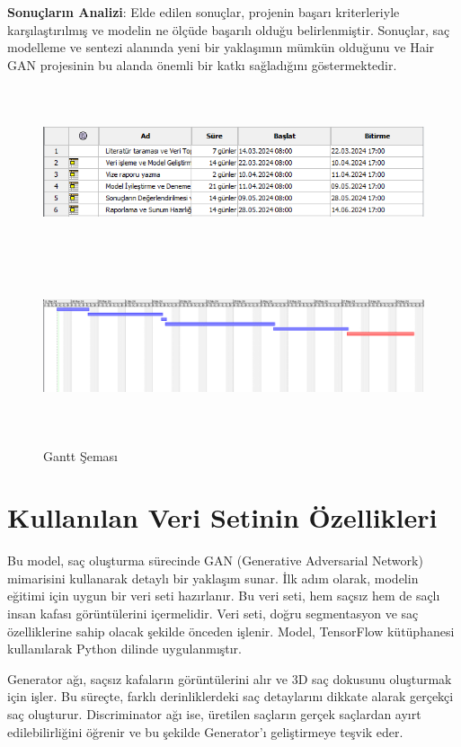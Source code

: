 \documentclass[12pt]{article}
\begin{document}
{\textbf{Sonuçların Analizi}}: Elde edilen sonuçlar, projenin başarı kriterleriyle karşılaştırılmış ve modelin ne ölçüde başarılı olduğu belirlenmiştir. Sonuçlar, saç modelleme ve sentezi alanında yeni bir yaklaşımın mümkün olduğunu ve Hair GAN projesinin bu alanda önemli bir katkı sağladığını göstermektedir.
\begin{figure}[h]
    \centering
    \includegraphics[width=1\textwidth, height=5cm, keepaspectratio]{gant2.PNG}\\
    \includegraphics[width=1\textwidth, height=5cm,keepaspectratio]{gant1.PNG}
    \caption{Gantt Şeması}
    \label{fig:enter-label}
\end{figure}
\section{Kullanılan Veri Setinin Özellikleri}
Bu model, saç oluşturma sürecinde GAN (Generative Adversarial Network) mimarisini kullanarak detaylı bir yaklaşım sunar. İlk adım olarak, modelin eğitimi için uygun bir veri seti hazırlanır. Bu veri seti, hem saçsız hem de saçlı insan kafası görüntülerini içermelidir. Veri seti, doğru segmentasyon ve saç özelliklerine sahip olacak şekilde önceden işlenir. Model, TensorFlow kütüphanesi kullanılarak Python dilinde uygulanmıştır.

Generator ağı, saçsız kafaların görüntülerini alır ve 3D saç dokusunu oluşturmak için işler. Bu süreçte, farklı derinliklerdeki saç detaylarını dikkate alarak gerçekçi saç oluşturur. Discriminator ağı ise, üretilen saçların gerçek saçlardan ayırt edilebilirliğini öğrenir ve bu şekilde Generator'ı geliştirmeye teşvik eder.
\end{document}
